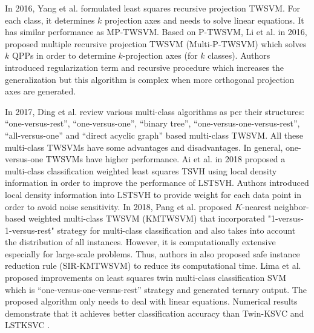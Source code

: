 \documentclass[pdflatex,sn-mathphys]{sn-jnl}%
\theoremstyle{thmstyleone}%
\theoremstyle{thmstyletwo}%
\theoremstyle{thmstylethree}%
\begin{document}
In 2016, Yang et al. \cite{yang2016least} formulated least squares recursive projection TWSVM. For each class, it determines $k$  projection axes and needs to solve linear equations. It has similar performance as MP-TWSVM. Based on P-TWSVM, Li et al. \cite{li2016multiple} in 2016, proposed multiple recursive projection TWSVM (Multi-P-TWSVM) which solves $k$ QPPs in order to determine $k$-projection axes (for $k$ classes). Authors introduced regularization term and recursive procedure which increases the generalization but this algorithm is complex when more orthogonal projection axes are generated.

In 2017, Ding et al. \cite{ding2017review} review various multi-class algorithms as per their structures: ``one-versus-rest'', ``one-versus-one'',  ``binary tree'', ``one-versus-one-versus-rest'', ``all-versus-one''  and ``direct acyclic graph'' based multi-class TWSVM. All these multi-class TWSVMs have some advantages and disadvantages. In general, one-versus-one TWSVMs have higher performance. Ai et al. \cite{ai2018multi} in 2018 proposed a multi-class classification weighted least squares TSVH using local density information in order to improve the performance of LSTSVH. Authors introduced local density information into LSTSVH to provide weight for each data point in order to avoid noise sensitivity. In 2018, Pang et al. \cite{pang2018scaling} proposed $K$-nearest neighbor-based weighted multi-class TWSVM (KMTWSVM) that incorporated "1-versus-1-versus-rest" strategy for multi-class classification and also takes into account the distribution of all instances. However, it is computationally extensive especially for large-scale problems. Thus, authors in \cite{pang2018scaling} also proposed safe instance reduction rule (SIR-KMTWSVM) to reduce its computational time. Lima et al. \cite{de2018improvements} proposed improvements on least squares
twin multi-class classification SVM which is ``one-versus-one-versus-rest'' strategy and generated ternary output. The proposed algorithm only needs to deal with linear equations. Numerical results demonstrate that it achieves better classification accuracy than Twin-KSVC \cite{xu2013twin} and LSTKSVC \cite{nasiri2015least}. 
\end{document}
